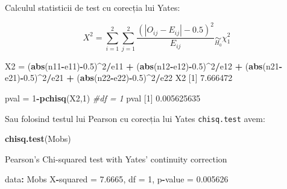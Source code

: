 \documentclass[]{article}
\newenvironment{Shaded}{\begin{snugshade}}{\end{snugshade}}
\newcommand{\KeywordTok}[1]{\textcolor[rgb]{0.13,0.29,0.53}{\textbf{#1}}}
\newcommand{\DecValTok}[1]{\textcolor[rgb]{0.00,0.00,0.81}{#1}}
\newcommand{\FloatTok}[1]{\textcolor[rgb]{0.00,0.00,0.81}{#1}}
\newcommand{\StringTok}[1]{\textcolor[rgb]{0.31,0.60,0.02}{#1}}
\newcommand{\CommentTok}[1]{\textcolor[rgb]{0.56,0.35,0.01}{\textit{#1}}}
\newcommand{\OperatorTok}[1]{\textcolor[rgb]{0.81,0.36,0.00}{\textbf{#1}}}
\newcommand{\NormalTok}[1]{#1}
\begin{document}

Calculul statisticii de test cu corecția lui Yates:

\[
  X^2 = \sum_{i=1}^{2}\sum_{j=1}^{2}\frac{\left(|O_{ij}-E_{ij}|-0.5\right)^2}{E_{ij}}\underset{H_0}{\sim}\chi_1^2
\]

\begin{Shaded}
\begin{Highlighting}[]
\NormalTok{X2 =}\StringTok{ }\NormalTok{(}\KeywordTok{abs}\NormalTok{(n11}\OperatorTok{-}\NormalTok{e11)}\OperatorTok{-}\FloatTok{0.5}\NormalTok{)}\OperatorTok{^}\DecValTok{2}\OperatorTok{/}\NormalTok{e11 }\OperatorTok{+}\StringTok{ }\NormalTok{(}\KeywordTok{abs}\NormalTok{(n12}\OperatorTok{-}\NormalTok{e12)}\OperatorTok{-}\FloatTok{0.5}\NormalTok{)}\OperatorTok{^}\DecValTok{2}\OperatorTok{/}\NormalTok{e12 }\OperatorTok{+}\StringTok{ }
\StringTok{  }\NormalTok{(}\KeywordTok{abs}\NormalTok{(n21}\OperatorTok{-}\NormalTok{e21)}\OperatorTok{-}\FloatTok{0.5}\NormalTok{)}\OperatorTok{^}\DecValTok{2}\OperatorTok{/}\NormalTok{e21 }\OperatorTok{+}\StringTok{ }\NormalTok{(}\KeywordTok{abs}\NormalTok{(n22}\OperatorTok{-}\NormalTok{e22)}\OperatorTok{-}\FloatTok{0.5}\NormalTok{)}\OperatorTok{^}\DecValTok{2}\OperatorTok{/}\NormalTok{e22}
\NormalTok{X2}
\NormalTok{[}\DecValTok{1}\NormalTok{] }\FloatTok{7.666472}

\NormalTok{pval =}\StringTok{ }\DecValTok{1}\OperatorTok{-}\KeywordTok{pchisq}\NormalTok{(X2,}\DecValTok{1}\NormalTok{) }\CommentTok{#df = 1}
\NormalTok{pval}
\NormalTok{[}\DecValTok{1}\NormalTok{] }\FloatTok{0.005625635}
\end{Highlighting}
\end{Shaded}

Sau folosind testul lui Pearson cu corecția lui Yates
\texttt{chisq.test} avem:

\begin{Shaded}
\begin{Highlighting}[]
\KeywordTok{chisq.test}\NormalTok{(Mobs)}

\NormalTok{    Pearson}\StringTok{'s Chi-squared test with Yates'}\NormalTok{ continuity correction}

\NormalTok{data}\OperatorTok{:}\StringTok{  }\NormalTok{Mobs}
\NormalTok{X}\OperatorTok{-}\NormalTok{squared =}\StringTok{ }\FloatTok{7.6665}\NormalTok{, df =}\StringTok{ }\DecValTok{1}\NormalTok{, p}\OperatorTok{-}\NormalTok{value =}\StringTok{ }\FloatTok{0.005626}
\end{Highlighting}
\end{Shaded}
\end{document}
